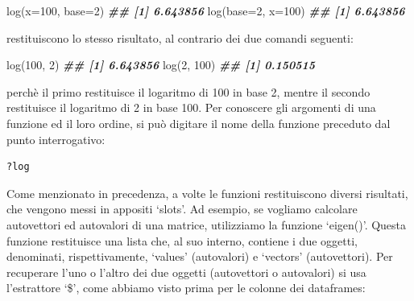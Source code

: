 \documentclass[
  12pt,
]{book}
\newenvironment{Shaded}{\begin{snugshade}}{\end{snugshade}}
\newcommand{\AttributeTok}[1]{\textcolor[rgb]{0.77,0.63,0.00}{#1}}
\newcommand{\DecValTok}[1]{\textcolor[rgb]{0.00,0.00,0.81}{#1}}
\newcommand{\DocumentationTok}[1]{\textcolor[rgb]{0.56,0.35,0.01}{\textbf{\textit{#1}}}}
\newcommand{\FunctionTok}[1]{\textcolor[rgb]{0.00,0.00,0.00}{#1}}
\newcommand{\NormalTok}[1]{#1}
\newcommand{\OtherTok}[1]{\textcolor[rgb]{0.56,0.35,0.01}{#1}}
\newcommand{\SpecialCharTok}[1]{\textcolor[rgb]{0.00,0.00,0.00}{#1}}
\begin{document}
\begin{Shaded}
\begin{Highlighting}[]
\FunctionTok{log}\NormalTok{(}\AttributeTok{x=}\DecValTok{100}\NormalTok{, }\AttributeTok{base=}\DecValTok{2}\NormalTok{)}
\DocumentationTok{\#\# [1] 6.643856}
\FunctionTok{log}\NormalTok{(}\AttributeTok{base=}\DecValTok{2}\NormalTok{, }\AttributeTok{x=}\DecValTok{100}\NormalTok{)}
\DocumentationTok{\#\# [1] 6.643856}
\end{Highlighting}
\end{Shaded}

restituiscono lo stesso risultato, al contrario dei due comandi seguenti:

\begin{Shaded}
\begin{Highlighting}[]
\FunctionTok{log}\NormalTok{(}\DecValTok{100}\NormalTok{, }\DecValTok{2}\NormalTok{)}
\DocumentationTok{\#\# [1] 6.643856}
\FunctionTok{log}\NormalTok{(}\DecValTok{2}\NormalTok{, }\DecValTok{100}\NormalTok{)}
\DocumentationTok{\#\# [1] 0.150515}
\end{Highlighting}
\end{Shaded}

perchè il primo restituisce il logaritmo di 100 in base 2, mentre il secondo restituisce il logaritmo di 2 in base 100. Per conoscere gli argomenti di una funzione ed il loro ordine, si può digitare il nome della funzione preceduto dal punto interrogativo:

\begin{verbatim}
?log
\end{verbatim}

Come menzionato in precedenza, a volte le funzioni restituiscono diversi risultati, che vengono messi in appositi `slots'. Ad esempio, se vogliamo calcolare autovettori ed autovalori di una matrice, utilizziamo la funzione `eigen()'. Questa funzione restituisce una lista che, al suo interno, contiene i due oggetti, denominati, rispettivamente, `values' (autovalori) e `vectors' (autovettori). Per recuperare l'uno o l'altro dei due oggetti (autovettori o autovalori) si usa l'estrattore `\$', come abbiamo visto prima per le colonne dei dataframes:

\begin{Shaded}
\end{Shaded}
\end{document}
